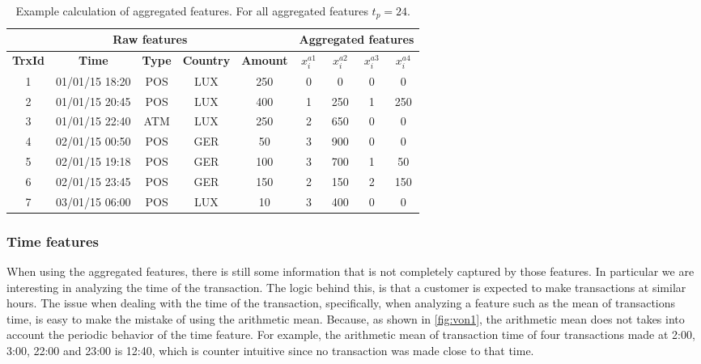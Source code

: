 	\begin{table}[!t]
		\centering
    \footnotesize
   \begin{tabular}{|c c c c c | c c c c|}
   \hline
   \multicolumn{5}{|c|}{\textbf{Raw features}} & \multicolumn{4}{c|}{\textbf{Aggregated features}} 
		\\  \hline
   \textbf{TrxId} &\textbf{Time} & \textbf{Type} & \textbf{Country} & 
	\textbf{Amount} 		& $x_i^{a1}$& $x_i^{a2}$ & $x_i^{a3}$ & $x_i^{a4}$\\
   \hline
		1&  01/01/15 18:20& POS & LUX & 250 & 0 & 0  & 0 & 0\\
		2& 01/01/15 20:45& POS & LUX & 400 & 1 & 250& 1 & 250\\
		3& 01/01/15 22:40& ATM & LUX & 250 & 2 & 650& 0 & 0\\
		4&02/01/15 00:50& POS & GER & 50 		& 3 & 900& 0& 0\\
		5& 02/01/15 19:18& POS & GER & 100 	  & 3 & 700& 1& 50\\
		6& 02/01/15 23:45& POS & GER & 150 	  & 2 & 150& 2& 150\\
		7& 03/01/15 06:00& POS & LUX & 10  & 3 & 400& 0& 0\\
   \hline
   \end{tabular}
		\caption{Example calculation of aggregated features. For all aggregated features $t_p=24$.}
		\label{tab:agg_features_example1}
  \end{table}
	
	\subsubsection{Time features}
	\label{sec:4:frad:features_time}
	
	When using the aggregated features, there is still some information that is not completely 
	captured by those features. In particular we are interesting in analyzing the time of the 
	transaction. The logic behind this, is that a customer is expected to make transactions at 
	similar hours. The issue when dealing with the time of the transaction, 
	specifically, when analyzing a feature such as the mean of transactions time, is easy 
	to make the mistake of using the arithmetic mean. Because, as shown in \figurename{ 
	\ref{fig:von1}}, the arithmetic mean does not takes into account the periodic behavior of the 
	time feature. For example, the arithmetic mean of transaction time of four transactions made at 
	2:00, 3:00, 22:00 and 23:00 is 12:40, which is counter intuitive since no transaction was made 
	close to that time. 
		
